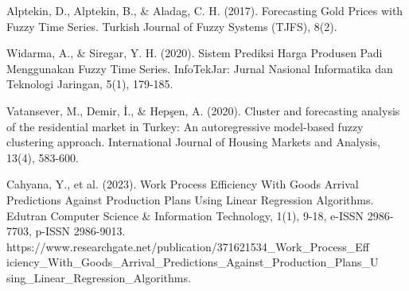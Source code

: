 \documentclass[conference]{IEEEtran}
\begin{document}
\begin{thebibliography}{00}
 Alptekin, D., Alptekin, B., \& Aladag, C. H. (2017). Forecasting Gold Prices with Fuzzy Time Series. Turkish Journal of Fuzzy Systems (TJFS), 8(2).

 Widarma, A., \& Siregar, Y. H. (2020). Sistem Prediksi Harga Produsen Padi Menggunakan Fuzzy Time Series. InfoTekJar: Jurnal Nasional Informatika dan Teknologi Jaringan, 5(1), 179-185.

 Vatansever, M., Demir, İ., \& Hepşen, A. (2020). Cluster and forecasting analysis of the residential market in Turkey: An autoregressive model-based fuzzy clustering approach. International Journal of Housing Markets and Analysis, 13(4), 583-600.

 Cahyana, Y., et al. (2023). Work Process Efficiency With Goods Arrival Predictions Against Production Plans Using Linear Regression Algorithms. Edutran Computer Science \& Information Technology, 1(1), 9-18, e-ISSN 2986-7703, p-ISSN 2986-9013. https://www.researchgate.net/publication/371621534\_Work\_Process\_Eff\\iciency\_With\_Goods\_Arrival\_Predictions\_Against\_Production\_Plans\_U\\sing\_Linear\_Regression\_Algorithms.


\end{thebibliography}
\end{document}
